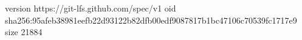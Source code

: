 version https://git-lfs.github.com/spec/v1
oid sha256:95afeb38981eefb22d93122b82dfb00edf9087817b1bc47106c70539fc1717e9
size 21884
